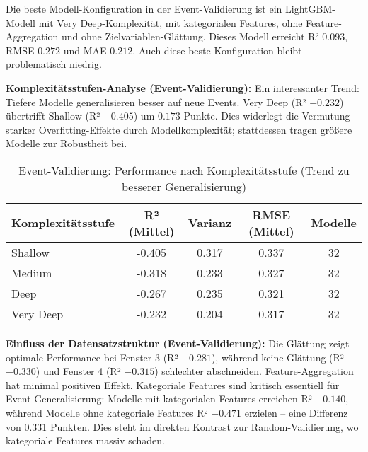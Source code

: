 Die beste Modell-Konfiguration in der Event-Validierung ist ein LightGBM-Modell mit Very Deep-Komplexität, mit kategorialen Features, ohne Feature-Aggregation und ohne Zielvariablen-Glättung. Dieses Modell erreicht R² $0.093$, RMSE $0.272$ und MAE $0.212$. Auch diese beste Konfiguration bleibt problematisch niedrig.

\textbf{Komplexitätsstufen-Analyse (Event-Validierung):}
Ein interessanter Trend: Tiefere Modelle generalisieren besser auf neue Events. Very Deep (R² $-0.232$) übertrifft Shallow (R² $-0.405$) um $0.173$ Punkte. Dies widerlegt die Vermutung starker Overfitting-Effekte durch Modellkomplexität; stattdessen tragen größere Modelle zur Robustheit bei.

\begin{table}[H]
  \centering
  \begin{tabular}{lcccc}
    \toprule
    \textbf{Komplexitätsstufe} & \textbf{R² (Mittel)} & \textbf{Varianz} & \textbf{RMSE (Mittel)} & \textbf{Modelle} \\
    \midrule
    Shallow & -0.405 & 0.317 & 0.337 & 32 \\
    Medium & -0.318 & 0.233 & 0.327 & 32 \\
    Deep & -0.267 & 0.235 & 0.321 & 32 \\
    Very Deep & -0.232 & 0.204 & 0.317 & 32 \\
    \bottomrule
  \end{tabular}
  \caption{Event-Validierung: Performance nach Komplexitätsstufe (Trend zu besserer Generalisierung)}
  \label{tab:complexity_event}
\end{table}


\textbf{Einfluss der Datensatzstruktur (Event-Validierung):}
Die Glättung zeigt optimale Performance bei Fenster 3 (R² $-0.281$), während keine Glättung (R² $-0.330$) und Fenster 4 (R² $-0.315$) schlechter abschneiden. Feature-Aggregation hat minimal positiven Effekt. Kategoriale Features sind kritisch essentiell für Event-Generalisierung: Modelle mit kategorialen Features erreichen R² $-0.140$, während Modelle ohne kategoriale Features R² $-0.471$ erzielen – eine Differenz von 0.331 Punkten. Dies steht im direkten Kontrast zur Random-Validierung, wo kategoriale Features massiv schaden.

